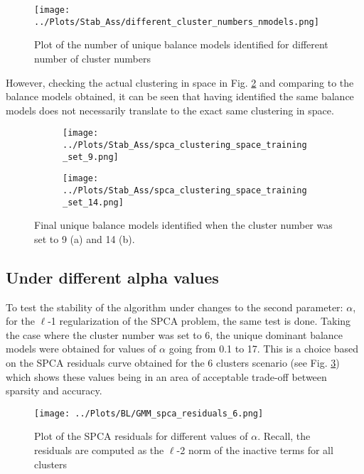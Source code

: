 \documentclass[12pt]{report} %
\begin{document}
\begin{figure}[htbp]
  \centering
  \texttt{[image: ../Plots/Stab\_Ass/different\_cluster\_numbers\_nmodels.png]}
  \caption{Plot of the number of unique balance models identified for different number of cluster numbers}
  \label{fig:diff_clust_num_nmodels}
\end{figure}

However, checking the actual clustering in space in Fig. \ref{fig:diif_clust_num_clustering} and comparing to the balance models obtained, it can be seen that having identified the same balance models does not necessarily translate to the exact same clustering in space.


\begin{figure}[htbp]
  \centering
  \begin{subfigure}[b]{0.7\textwidth}
      \texttt{[image: ../Plots/Stab\_Ass/spca\_clustering\_space\_training\_set\_9.png]}
      \caption{}
  \end{subfigure}
  \begin{subfigure}[b]{0.7\textwidth}
      \texttt{[image: ../Plots/Stab\_Ass/spca\_clustering\_space\_training\_set\_14.png]}
      \caption{}
  \end{subfigure}
  \caption{Final unique balance models identified when the cluster number was set to 9 (a) and 14 (b).}
  \label{fig:diif_clust_num_clustering}
\end{figure}

\subsection{Under different alpha values}

To test the stability of the algorithm under changes to the second parameter: $\alpha$, for the $\ell$-1 regularization of the SPCA problem, the same test is done. Taking the case where the cluster number was set to 6, the unique dominant balance models were obtained for values of $\alpha$ going from 0.1 to 17. This is a choice based on the SPCA residuals curve obtained for the 6 clusters scenario (see Fig. \ref{fig:spca_residuals}) which shows these values being in an area of acceptable trade-off between sparsity and accuracy.

\begin{figure}
  \centering
  \texttt{[image: ../Plots/BL/GMM\_spca\_residuals\_6.png]}
  \caption{Plot of the SPCA residuals for different values of $\alpha$. Recall, the residuals are computed as the $\ell$-2 norm of the inactive terms for all clusters}
  \label{fig:spca_residuals}
\end{figure}
\end{document}

